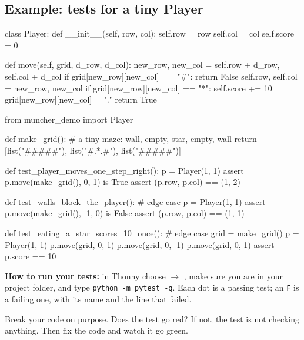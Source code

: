 \subsection{Example: tests for a tiny Player}
\begin{pycode}
class Player:
    def __init__(self, row, col):
        self.row = row
        self.col = col
        self.score = 0

    def move(self, grid, d_row, d_col):
        new_row, new_col = self.row + d_row, self.col + d_col
        if grid[new_row][new_col] == "#":
            return False
        self.row, self.col = new_row, new_col
        if grid[new_row][new_col] == "*":
            self.score += 10
            grid[new_row][new_col] = "."
        return True
\end{pycode}
\begin{pycode}
from muncher_demo import Player

def make_grid():   # a tiny maze: wall, empty, star, empty, wall
    return [list("#####"), list("#.*.#"), list("#####")]

def test_player_moves_one_step_right():
    p = Player(1, 1)
    assert p.move(make_grid(), 0, 1) is True
    assert (p.row, p.col) == (1, 2)

def test_walls_block_the_player():          # edge case
    p = Player(1, 1)
    assert p.move(make_grid(), -1, 0) is False
    assert (p.row, p.col) == (1, 1)

def test_eating_a_star_scores_10_once():    # edge case
    grid = make_grid()
    p = Player(1, 1)
    p.move(grid, 0, 1)
    p.move(grid, 0, -1)
    p.move(grid, 0, 1)
    assert p.score == 10
\end{pycode}
\textbf{How to run your tests:} in Thonny choose  $\rightarrow$ , make sure you are in your project folder, and type \texttt{python -m pytest -q}. Each dot is a passing test; an \texttt{F} is a failing one, with its name and the line that failed.

\begin{tip}
Break your code on purpose. Does the test go red? If not, the test is not checking anything. Then fix the code and watch it go green.
\end{tip}

